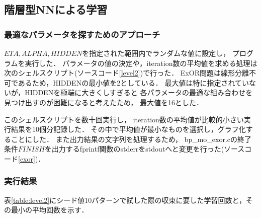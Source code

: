 \subsection{階層型NNによる学習}
\subsubsection{最適なパラメータを探すためのアプローチ}
% 

$ETA,ALPHA,HIDDEN$を指定された範囲内でランダムな値に設定し，
プログラムを実行した．
パラメータの値の決定や，iteration数の平均値を求める処理は
次のシェルスクリプト(ソースコード\ref{level2})で行った．
ExOR問題は線形分離不可であるため，HIDDENの最小値を2としている．
最大値は特に指定されていないが，HIDDENを極端に大きくしすぎると
各パラメータの最適な組み合わせを見つけ出すのが困難になると考えたため，
最大値を16とした．




このシェルスクリプトを数十回実行し，
iteration数の平均値が比較的小さい実行結果を10個分記録した．
その中で平均値が最小なものを選択し，グラフ化することにした．
また出力結果の文字列を処理するため，
bp\_mo\_exor.cの終了条件$FINISH$を出力するfprintf関数のstderrをstdoutへと変更を行った(ソースコード\ref{exor})．




\subsubsection{実行結果}


表\ref{table:level2}にシード値10パターンで試した際の収束に要した学習回数と，その最小の平均回数を示す．

